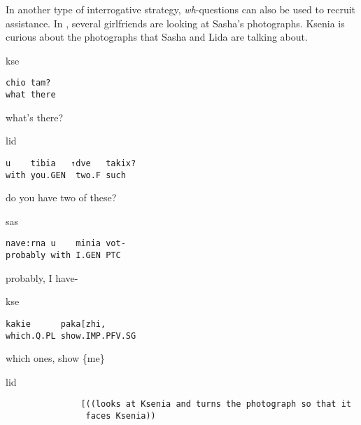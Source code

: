 \documentclass[output=paper,modfonts,nonflat]{langsci/langscibook}
\begin{document}
In another type of interrogative strategy, \textit{wh}-questions can also be used to recruit assistance. In , several girlfriends are looking at Sasha's photographs. Ksenia is curious about the photographs that Sasha and Lida are talking about.

\vspace{-1mm}
%
\begin{mdframednoverticalspace}[style=firstfoc]
%
\begin{transbox}{1}{kse}
\begin{verbatim}
chio tam?
what there
\end{verbatim}
what's there?
\end{transbox}
\end{mdframednoverticalspace}
%
\begin{transbox}{2}{lid}
\begin{verbatim}
u    tibia   ↑dve   takix?
with you.GEN  two.F such
\end{verbatim}
do you have two of these?
\end{transbox}
%
\begin{transbox}{3}{sas}
\begin{verbatim}
nave:rna u    minia vot-
probably with I.GEN PTC
\end{verbatim}
probably, I have-
\end{transbox}
%
\begin{mdframednoverticalspace}[style=firstfoc]
\begin{transbox}{4}{kse}
\begin{verbatim}
kakie      paka[zhi,
which.Q.PL show.IMP.PFV.SG
\end{verbatim}
which ones, show \{me\}
\end{transbox}
\end{mdframednoverticalspace}
%
\begin{mdframednoverticalspace}[style=secondfoc]
\begin{transbox}{5}{lid}
\begin{verbatim}
               [((looks at Ksenia and turns the photograph so that it  
                faces Ksenia))
\end{verbatim}
\end{transbox}
\end{mdframednoverticalspace}\bigskip
%
\end{document}
